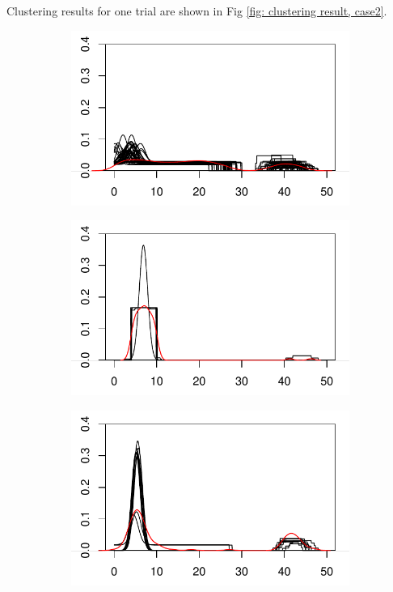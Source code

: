 \noindent
Clustering results for one trial are shown in Fig \ref{fig: clustering result, case2}.
\\
\begin{figure}[H]
\begin{minipage}{.49\textwidth}
\begin{subfigure}{\linewidth}
\includegraphics[width=\linewidth]{../simulation/plots/case2_clus1.pdf}
\end{subfigure}
\begin{subfigure}{\linewidth}
\includegraphics[width=\linewidth]{../simulation/plots/case2_clus2.pdf}
\end{subfigure}
\begin{subfigure}{\linewidth}
\includegraphics[width=\linewidth]{../simulation/plots/case2_clus3.pdf}

\end{subfigure}
\end{minipage}
\end{figure}
